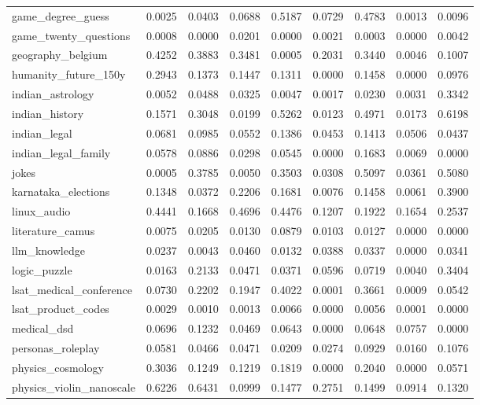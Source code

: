 \documentclass[pdflatex,sn-mathphys-num]{sn-jnl}%
\theoremstyle{thmstyleone}%
\theoremstyle{thmstyletwo}%
\theoremstyle{thmstylethree}%
\begin{document}
\begin{appendices}
\begin{landscape}
\begin{longtable}{@{}p{3.8cm}cccccccc@{}}
game\_degree\_guess & 0.0025 & 0.0403 & 0.0688 & 0.5187 & 0.0729 & 0.4783 & 0.0013 & 0.0096 \\
game\_twenty\_questions & 0.0008 & 0.0000 & 0.0201 & 0.0000 & 0.0021 & 0.0003 & 0.0000 & 0.0042 \\
geography\_belgium & 0.4252 & 0.3883 & 0.3481 & 0.0005 & 0.2031 & 0.3440 & 0.0046 & 0.1007 \\
humanity\_future\_150y & 0.2943 & 0.1373 & 0.1447 & 0.1311 & 0.0000 & 0.1458 & 0.0000 & 0.0976 \\
indian\_astrology & 0.0052 & 0.0488 & 0.0325 & 0.0047 & 0.0017 & 0.0230 & 0.0031 & 0.3342 \\
indian\_history & 0.1571 & 0.3048 & 0.0199 & 0.5262 & 0.0123 & 0.4971 & 0.0173 & 0.6198 \\
indian\_legal & 0.0681 & 0.0985 & 0.0552 & 0.1386 & 0.0453 & 0.1413 & 0.0506 & 0.0437 \\
indian\_legal\_family & 0.0578 & 0.0886 & 0.0298 & 0.0545 & 0.0000 & 0.1683 & 0.0069 & 0.0000 \\
jokes & 0.0005 & 0.3785 & 0.0050 & 0.3503 & 0.0308 & 0.5097 & 0.0361 & 0.5080 \\
karnataka\_elections & 0.1348 & 0.0372 & 0.2206 & 0.1681 & 0.0076 & 0.1458 & 0.0061 & 0.3900 \\
linux\_audio & 0.4441 & 0.1668 & 0.4696 & 0.4476 & 0.1207 & 0.1922 & 0.1654 & 0.2537 \\
literature\_camus & 0.0075 & 0.0205 & 0.0130 & 0.0879 & 0.0103 & 0.0127 & 0.0000 & 0.0000 \\
llm\_knowledge & 0.0237 & 0.0043 & 0.0460 & 0.0132 & 0.0388 & 0.0337 & 0.0000 & 0.0341 \\
logic\_puzzle & 0.0163 & 0.2133 & 0.0471 & 0.0371 & 0.0596 & 0.0719 & 0.0040 & 0.3404 \\
lsat\_medical\_conference & 0.0730 & 0.2202 & 0.1947 & 0.4022 & 0.0001 & 0.3661 & 0.0009 & 0.0542 \\
lsat\_product\_codes & 0.0029 & 0.0010 & 0.0013 & 0.0066 & 0.0000 & 0.0056 & 0.0001 & 0.0000 \\
medical\_dsd & 0.0696 & 0.1232 & 0.0469 & 0.0643 & 0.0000 & 0.0648 & 0.0757 & 0.0000 \\
personas\_roleplay & 0.0581 & 0.0466 & 0.0471 & 0.0209 & 0.0274 & 0.0929 & 0.0160 & 0.1076 \\
physics\_cosmology & 0.3036 & 0.1249 & 0.1219 & 0.1819 & 0.0000 & 0.2040 & 0.0000 & 0.0571 \\
physics\_violin\_nanoscale & 0.6226 & 0.6431 & 0.0999 & 0.1477 & 0.2751 & 0.1499 & 0.0914 & 0.1320 \\

\end{longtable}
\end{landscape}
\end{appendices}
\end{document}
